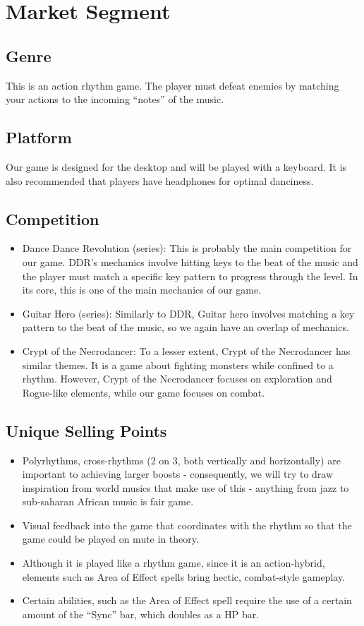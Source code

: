 \documentclass[]{article}
\begin{document}
\pagebreak
\section*{Market Segment}
\subsection*{Genre}
This is an action rhythm game. The player must defeat enemies by matching your 
actions to the incoming ``notes'' of the music.

\subsection*{Platform}
Our game is designed for the desktop and will be played with a keyboard. 
It is also recommended that players have headphones for optimal danciness. 

\subsection*{Competition}
\begin{itemize}
\item Dance Dance Revolution (series): This is probably the main
  competition for our game. DDR's mechanics involve hitting keys to the
  beat of the music and the player must match a specific key pattern to
  progress through the level. In its core, this is one of the main
  mechanics of our game.
\item Guitar Hero (series): Similarly to DDR, Guitar hero involves
  matching a key pattern to the beat of the music, so we again have an
  overlap of mechanics.
\item Crypt of the Necrodancer: To a lesser extent, Crypt of the
  Necrodancer has similar themes. It is a game about fighting monsters
  while confined to a rhythm. However, Crypt of the Necrodancer focuses
  on exploration and Rogue-like elements, while our game focuses on
  combat.
\end{itemize}
\subsection*{Unique Selling Points}
\begin{itemize}
\item Polyrhythms, cross-rhythms (2 on 3, both vertically and
  horizontally) are important to achieving larger boosts - consequently,
  we will try to draw inspiration from world musics that make use of
  this - anything from jazz to sub-saharan African music is fair game.
\item Visual feedback into the game that coordinates with the rhythm
  so that the game could be played on mute in theory.
\item Although it is played like a rhythm game, since it is an
  action-hybrid, elements such as Area of Effect spells bring hectic,
  combat-style gameplay.
\item Certain abilities, such as the Area of Effect spell require the
  use of a certain amount of the ``Sync'' bar, which doubles as a HP bar.
\end{itemize}
\end{document}
